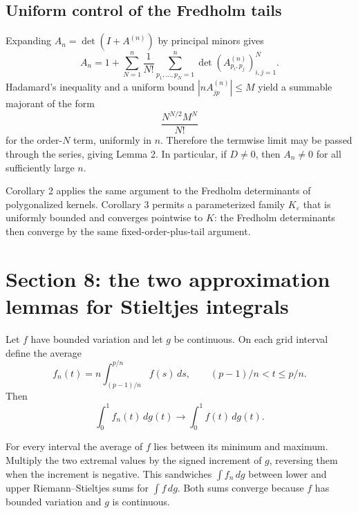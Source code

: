 \subsection{Uniform control of the Fredholm tails}
Expanding \(A_n=\det(I+A^{(n)})\) by principal minors gives
\[
 A_n=1+\sum_{N=1}^n\frac1{N!}
 \sum_{p_1,\ldots,p_N=1}^n
 \det(A^{(n)}_{p_i,p_j})_{i,j=1}^N.
\]
Hadamard's inequality and a uniform bound \(|nA^{(n)}_{jp}|\le M\) yield a summable majorant of the form
\[
 \frac{N^{N/2}M^N}{N!}
\]
for the order-\(N\) term, uniformly in \(n\).  Therefore the termwise limit may be passed through the series, giving Lemma 2.  In particular, if \(D\ne0\), then \(A_n\ne0\) for all sufficiently large \(n\).

Corollary 2 applies the same argument to the Fredholm determinants of polygonalized kernels.  Corollary 3 permits a parameterized family \(K_\varepsilon\) that is uniformly bounded and converges pointwise to \(K\): the Fredholm determinants then converge by the same fixed-order-plus-tail argument.

\section{Section 8: the two approximation lemmas for Stieltjes integrals}

\begin{lemma}[Lemma 5]
Let \(f\) have bounded variation and let \(g\) be continuous.  On each grid interval define the average
\[
 f_n(t)=n\int_{(p-1)/n}^{p/n}f(s)\,ds,
 \qquad (p-1)/n<t\le p/n.
\]
Then
\[
 \int_0^1f_n(t)\,dg(t)\longrightarrow\int_0^1f(t)\,dg(t).
\]
\end{lemma}

For every interval the average of \(f\) lies between its minimum and maximum.  Multiply the two extremal values by the signed increment of \(g\), reversing them when the increment is negative.  This sandwiches \(\int f_n\,dg\) between lower and upper Riemann--Stieltjes sums for \(\int f\,dg\).  Both sums converge because \(f\) has bounded variation and \(g\) is continuous.


